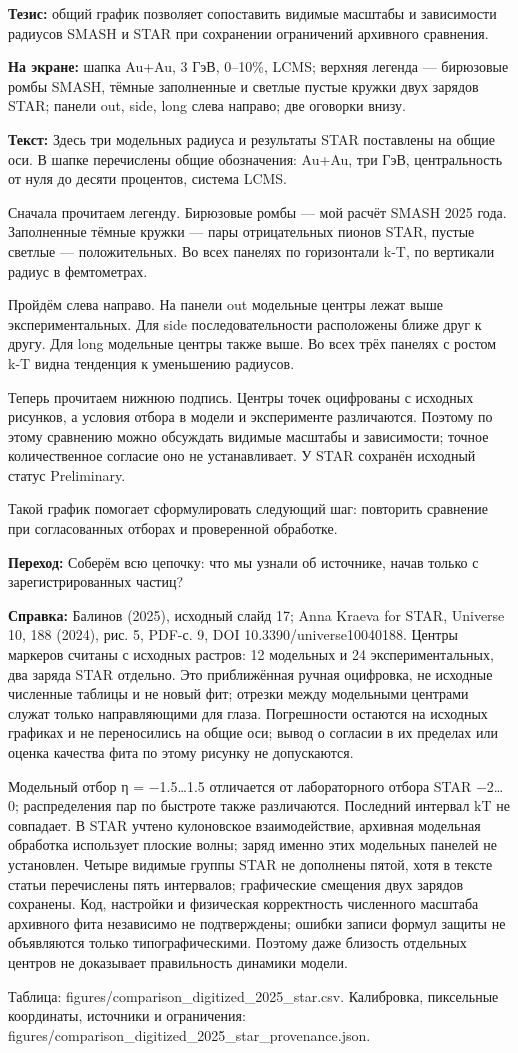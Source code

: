 \documentclass[11pt,a4paper]{article}
\begin{document}
\textbf{Тезис:} общий график позволяет сопоставить видимые масштабы и зависимости радиусов SMASH и STAR при сохранении ограничений архивного сравнения.

\textbf{На экране:} шапка Au+Au, 3 ГэВ, 0–10\%, LCMS; верхняя легенда — бирюзовые ромбы SMASH, тёмные заполненные и светлые пустые кружки двух зарядов STAR; панели out, side, long слева направо; две оговорки внизу.

\textbf{Текст:} Здесь три модельных радиуса и результаты STAR поставлены на общие оси. В шапке перечислены общие обозначения: Au+Au, три ГэВ, центральность от нуля до десяти процентов, система LCMS.

Сначала прочитаем легенду. Бирюзовые ромбы — мой расчёт SMASH 2025 года. Заполненные тёмные кружки — пары отрицательных пионов STAR, пустые светлые — положительных. Во всех панелях по горизонтали k-T, по вертикали радиус в фемтометрах.

Пройдём слева направо. На панели out модельные центры лежат выше экспериментальных. Для side последовательности расположены ближе друг к другу. Для long модельные центры также выше. Во всех трёх панелях с ростом k-T видна тенденция к уменьшению радиусов.

Теперь прочитаем нижнюю подпись. Центры точек оцифрованы с исходных рисунков, а условия отбора в модели и эксперименте различаются. Поэтому по этому сравнению можно обсуждать видимые масштабы и зависимости; точное количественное согласие оно не устанавливает. У STAR сохранён исходный статус Preliminary.

Такой график помогает сформулировать следующий шаг: повторить сравнение при согласованных отборах и проверенной обработке.

\textbf{Переход:} Соберём всю цепочку: что мы узнали об источнике, начав только с зарегистрированных частиц?

\textbf{Справка:} Балинов (2025), исходный слайд 17; Anna Kraeva for STAR, Universe 10, 188 (2024), рис. 5, PDF-с. 9, DOI 10.3390/universe10040188. Центры маркеров считаны с исходных растров: 12 модельных и 24 экспериментальных, два заряда STAR отдельно. Это приближённая ручная оцифровка, не исходные численные таблицы и не новый фит; отрезки между модельными центрами служат только направляющими для глаза. Погрешности остаются на исходных графиках и не переносились на общие оси; вывод о согласии в их пределах или оценка качества фита по этому рисунку не допускаются.

Модельный отбор η = −1.5…1.5 отличается от лабораторного отбора STAR −2…0; распределения пар по быстроте также различаются. Последний интервал kT не совпадает. В STAR учтено кулоновское взаимодействие, архивная модельная обработка использует плоские волны; заряд именно этих модельных панелей не установлен. Четыре видимые группы STAR не дополнены пятой, хотя в тексте статьи перечислены пять интервалов; графические смещения двух зарядов сохранены. Код, настройки и физическая корректность численного масштаба архивного фита независимо не подтверждены; ошибки записи формул защиты не объявляются только типографическими. Поэтому даже близость отдельных центров не доказывает правильность динамики модели.

Таблица: figures/comparison\_digitized\_2025\_star.csv. Калибровка, пиксельные координаты, источники и ограничения: figures/comparison\_digitized\_2025\_star\_provenance.json.
\end{document}
